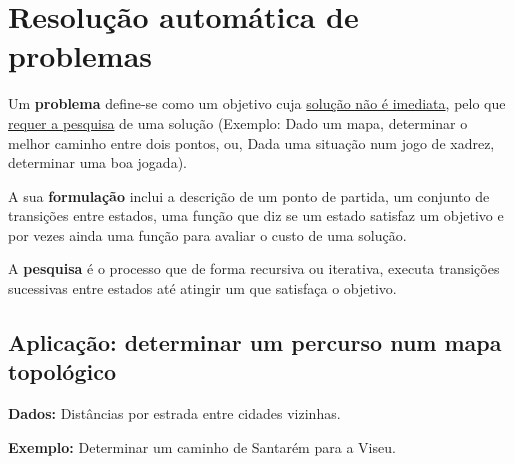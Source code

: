 \documentclass{article}
\begin{document}
\pagebreak

\section{Resolução automática de problemas}

Um \textbf{problema} define-se como um objetivo cuja \uline{solução não é imediata}, pelo que \uline{requer a
pesquisa} de uma solução (Exemplo: Dado um mapa, determinar o melhor caminho entre dois pontos,
ou, Dada uma situação num jogo de xadrez, determinar uma boa
jogada).

A sua \textbf{formulação} inclui a descrição de um ponto de partida, um conjunto de transições entre
estados, uma função que diz se um estado satisfaz um objetivo e por vezes ainda uma função
para avaliar o custo de uma solução.

A \textbf{pesquisa} é o processo que de forma recursiva ou iterativa, executa transições sucessivas
entre estados até atingir um que satisfaça o objetivo.

\subsection{Aplicação: determinar
um percurso num mapa
topológico}

\begin{flushleft}
  \textbf{Dados:} Distâncias por estrada entre cidades
  vizinhas.

  \vspace{2mm}

  \textbf{Exemplo:} Determinar um caminho de
  Santarém para a Viseu.
\end{flushleft}
\end{document}
